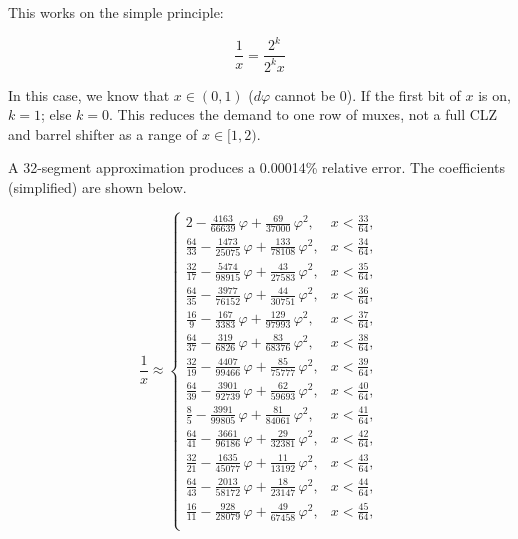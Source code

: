 This works on the simple principle:

\begin{equation*}
	\frac{1}{x}=\frac{2^{k}}{2^{k}x}
\end{equation*}

In this case, we know that $x\in(0,1)$ ($d\varphi$ cannot be 0).  If the first bit of $x$ is on, $k=1$; else $k=0$.  This reduces the demand to one row of muxes, not a full CLZ and barrel shifter as a range of $x\in[1,2)$.

A 32-segment approximation produces a 0.00014\% relative error.  The coefficients (simplified) are shown below.

\begin{equation*}
	\frac{1}{x}\approx
	\begin{cases}
		2 - \frac{4163}{66639}\,\varphi + \frac{69}{37000}\,\varphi^2, & x < \frac{33}{64},\\
		\frac{64}{33} - \frac{1473}{25075}\,\varphi + \frac{133}{78108}\,\varphi^2, & x < \frac{34}{64},\\
		\frac{32}{17} - \frac{5474}{98915}\,\varphi + \frac{43}{27583}\,\varphi^2, & x < \frac{35}{64},\\
		\frac{64}{35} - \frac{3977}{76152}\,\varphi + \frac{44}{30751}\,\varphi^2, & x < \frac{36}{64},\\
		\frac{16}{9} - \frac{167}{3383}\,\varphi + \frac{129}{97993}\,\varphi^2, & x < \frac{37}{64},\\
		\frac{64}{37} - \frac{319}{6826}\,\varphi + \frac{83}{68376}\,\varphi^2, & x < \frac{38}{64},\\
		\frac{32}{19} - \frac{4407}{99466}\,\varphi + \frac{85}{75777}\,\varphi^2, & x < \frac{39}{64},\\
		\frac{64}{39} - \frac{3901}{92739}\,\varphi + \frac{62}{59693}\,\varphi^2, & x < \frac{40}{64},\\
		\frac{8}{5} - \frac{3991}{99805}\,\varphi + \frac{81}{84061}\,\varphi^2, & x < \frac{41}{64},\\
		\frac{64}{41} - \frac{3661}{96186}\,\varphi + \frac{29}{32381}\,\varphi^2, & x < \frac{42}{64},\\
		\frac{32}{21} - \frac{1635}{45077}\,\varphi + \frac{11}{13192}\,\varphi^2, & x < \frac{43}{64},\\
		\frac{64}{43} - \frac{2013}{58172}\,\varphi + \frac{18}{23147}\,\varphi^2, & x < \frac{44}{64},\\
		\frac{16}{11} - \frac{928}{28079}\,\varphi + \frac{49}{67458}\,\varphi^2, & x < \frac{45}{64},\\

\end{cases}
\end{equation*}
